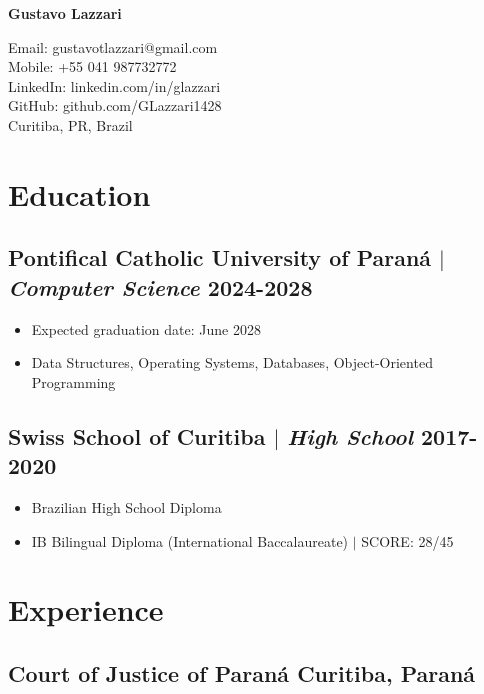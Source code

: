 \documentclass[11pt]{article} %
\begin{document}
\begin{center}
	\begin{minipage}{0.5\textwidth}
		{\Huge\bfseries
			Gustavo Lazzari %
		} \\ \medskip
	\end{minipage} \hfill
	\begin{minipage}{0.4\textwidth}
		\raggedleft
		Email: gustavotlazzari@gmail.com \\
		Mobile: +55 041 987732772 \\
		LinkedIn: linkedin.com/in/glazzari \\
		GitHub: github.com/GLazzari1428 \\
		Curitiba, PR, Brazil
	\end{minipage}
\end{center}

\section{Education}
\subsection{Pontifical Catholic University of Paraná $|$ {\normalfont\itshape Computer Science} \hfill 2024-2028}
\begin{itemize}
	\item Expected graduation date: June 2028
	\item Data Structures, Operating Systems, Databases, Object-Oriented Programming
\end{itemize}
\subsection{Swiss School of Curitiba $|$ {\normalfont\itshape High School} \hfill 2017-2020}
\begin{itemize}
	\item Brazilian High School Diploma
	\item IB Bilingual Diploma (International Baccalaureate) $|$ SCORE: 28/45
\end{itemize}

\section{Experience}
\subsection{Court of Justice of Paraná \hfill Curitiba, Paraná}
\end{document}

